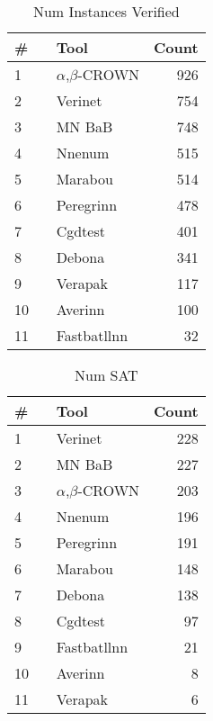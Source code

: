 
\begin{table}[h]
\begin{center}
\caption{Num Instances Verified} \label{tab:stats1}
{\setlength{\tabcolsep}{2pt}
\begin{tabular}[h]{@{}llr@{}}
\toprule
\textbf{\# ~} & \textbf{Tool} & \textbf{Count}\\
\midrule
1 & $\alpha$,$\beta$-CROWN & 926 \\
2 & Verinet & 754 \\
3 & MN BaB & 748 \\
4 & Nnenum & 515 \\
5 & Marabou & 514 \\
6 & Peregrinn & 478 \\
7 & Cgdtest & 401 \\
8 & Debona & 341 \\
9 & Verapak & 117 \\
10 & Averinn & 100 \\
11 & Fastbatllnn & 32 \\
\bottomrule
\end{tabular}
}
\end{center}
\end{table}




\begin{table}[h]
\begin{center}
\caption{Num SAT} \label{tab:stats2}
{\setlength{\tabcolsep}{2pt}
\begin{tabular}[h]{@{}llr@{}}
\toprule
\textbf{\# ~} & \textbf{Tool} & \textbf{Count}\\
\midrule
1 & Verinet & 228 \\
2 & MN BaB & 227 \\
3 & $\alpha$,$\beta$-CROWN & 203 \\
4 & Nnenum & 196 \\
5 & Peregrinn & 191 \\
6 & Marabou & 148 \\
7 & Debona & 138 \\
8 & Cgdtest & 97 \\
9 & Fastbatllnn & 21 \\
10 & Averinn & 8 \\
11 & Verapak & 6 \\
\bottomrule
\end{tabular}
}
\end{center}
\end{table}



